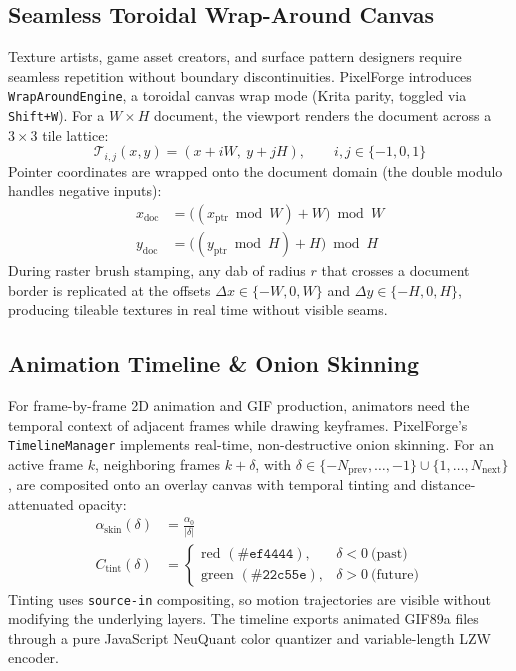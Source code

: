 \documentclass[10pt,journal,compsoc]{IEEEtran}
\begin{document}
\subsection{Seamless Toroidal Wrap-Around Canvas}
Texture artists, game asset creators, and surface pattern designers require seamless repetition without boundary discontinuities. PixelForge introduces \texttt{WrapAroundEngine}, a toroidal canvas wrap mode (Krita parity, toggled via \texttt{Shift+W}). For a $W \times H$ document, the viewport renders the document across a $3 \times 3$ tile lattice:
\begin{equation}
\mathcal{T}_{i,j}(x, y) = (x + iW,\ y + jH), \qquad i, j \in \{-1, 0, 1\}
\end{equation}
Pointer coordinates are wrapped onto the document domain (the double modulo handles negative inputs):
\begin{align}
x_{\text{doc}} &= \big((x_{\text{ptr}} \bmod W) + W\big) \bmod W \\
y_{\text{doc}} &= \big((y_{\text{ptr}} \bmod H) + H\big) \bmod H
\end{align}
During raster brush stamping, any dab of radius $r$ that crosses a document border is replicated at the offsets $\Delta x \in \{-W, 0, W\}$ and $\Delta y \in \{-H, 0, H\}$, producing tileable textures in real time without visible seams.

\subsection{Animation Timeline \& Onion Skinning}
For frame-by-frame 2D animation and GIF production, animators need the temporal context of adjacent frames while drawing keyframes. PixelForge's \texttt{TimelineManager} implements real-time, non-destructive onion skinning. For an active frame $k$, neighboring frames $k + \delta$, with $\delta \in \{-N_{\text{prev}}, \dots, -1\} \cup \{1, \dots, N_{\text{next}}\}$, are composited onto an overlay canvas with temporal tinting and distance-attenuated opacity:
\begin{align}
\alpha_{\text{skin}}(\delta) &= \frac{\alpha_0}{\lvert\delta\rvert} \\
C_{\text{tint}}(\delta) &=
\begin{cases}
\text{red } (\texttt{\#ef4444}), & \delta < 0 \ \text{(past)} \\
\text{green } (\texttt{\#22c55e}), & \delta > 0 \ \text{(future)}
\end{cases}
\end{align}
Tinting uses \texttt{source-in} compositing, so motion trajectories are visible without modifying the underlying layers. The timeline exports animated GIF89a files through a pure JavaScript NeuQuant color quantizer and variable-length LZW encoder.
\end{document}

